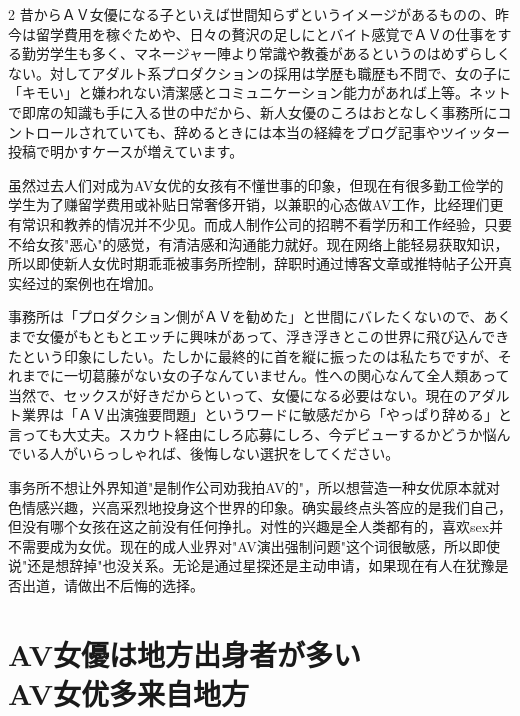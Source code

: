 \documentclass[12pt,UTF8]{ctexbook}
\begin{document}
\begin{paracol}{2}
昔からＡＶ女優になる子といえば世間知らずというイメージがあるものの、昨今は留学費用を稼ぐためや、日々の贅沢の足しにとバイト感覚でＡＶの仕事をする勤労学生も多く、マネージャー陣より常識や教養があるというのはめずらしくない。対してアダルト系プロダクションの採用は学歴も職歴も不問で、女の子に「キモい」と嫌われない清潔感とコミュニケーション能力があれば上等。ネットで即席の知識も手に入る世の中だから、新人女優のころはおとなしく事務所にコントロールされていても、辞めるときには本当の経緯をブログ記事やツイッター投稿で明かすケースが増えています。

\switchcolumn

虽然过去人们对成为AV女优的女孩有不懂世事的印象，但现在有很多勤工俭学的学生为了赚留学费用或补贴日常奢侈开销，以兼职的心态做AV工作，比经理们更有常识和教养的情况并不少见。而成人制作公司的招聘不看学历和工作经验，只要不给女孩"恶心"的感觉，有清洁感和沟通能力就好。现在网络上能轻易获取知识，所以即使新人女优时期乖乖被事务所控制，辞职时通过博客文章或推特帖子公开真实经过的案例也在增加。

\switchcolumn*

事務所は「プロダクション側がＡＶを勧めた」と世間にバレたくないので、あくまで女優がもともとエッチに興味があって、浮き浮きとこの世界に飛び込んできたという印象にしたい。たしかに最終的に首を縦に振ったのは私たちですが、それまでに一切葛藤がない女の子なんていません。性への関心なんて全人類あって当然で、セックスが好きだからといって、女優になる必要はない。現在のアダルト業界は「ＡＶ出演強要問題」というワードに敏感だから「やっぱり辞める」と言っても大丈夫。スカウト経由にしろ応募にしろ、今デビューするかどうか悩んでいる人がいらっしゃれば、後悔しない選択をしてください。

\switchcolumn

事务所不想让外界知道"是制作公司劝我拍AV的"，所以想营造一种女优原本就对色情感兴趣，兴高采烈地投身这个世界的印象。确实最终点头答应的是我们自己，但没有哪个女孩在这之前没有任何挣扎。对性的兴趣是全人类都有的，喜欢sex并不需要成为女优。现在的成人业界对"AV演出强制问题"这个词很敏感，所以即使说"还是想辞掉"也没关系。无论是通过星探还是主动申请，如果现在有人在犹豫是否出道，请做出不后悔的选择。

\end{paracol}

\section{AV女優は地方出身者が多い\\AV女优多来自地方}
\end{document}
